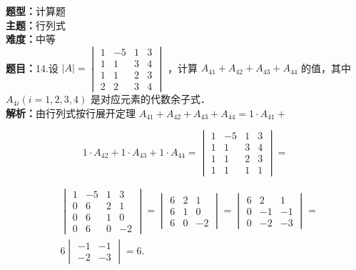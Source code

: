 \documentclass{ctexart}
\newenvironment{question}[5]{%
	\noindent\textbf{题型：}#1\\
	\textbf{主题：}#2\\
	\textbf{难度：}#3\\
	\textbf{题目：}#4\\
	\textbf{解析：}#5\\
	\vspace{1em}
}{}
\begin{document}
	\begin{question}
		{计算题}
		{行列式}
		{中等}
		{14.设 \(|A|=\begin{vmatrix}1 & -5 & 1 & 3 \\ 1 & 1 & 3 & 4 \\ 1 & 1 & 2 & 3 \\ 2 & 2 & 3 & 4\end{vmatrix}\) ，计算 \(A_{41}+A_{42}+A_{43}+A_{44}\) 的值，其中 \(A_{4 i}(i=1,2,3,4)\) 是对应元素的代数余子式．}
		{由行列式按行展开定理 \(A_{41}+A_{42}+A_{43}+A_{44}=1 \cdot A_{41}+\)
			
			\[
			1 \cdot A_{42}+1 \cdot A_{43}+1 \cdot A_{44}=\begin{vmatrix}
				1 & -5 & 1 & 3 \\
				1 & 1 & 3 & 4 \\
				1 & 1 & 2 & 3 \\
				1 & 1 & 1 & 1
			\end{vmatrix}=
			\]
			
			
			\[
			\begin{aligned}
				& \begin{vmatrix}
					1 & -5 & 1 & 3 \\
					0 & 6 & 2 & 1 \\
					0 & 6 & 1 & 0 \\
					0 & 6 & 0 & -2
				\end{vmatrix}=\begin{vmatrix}
					6 & 2 & 1 \\
					6 & 1 & 0 \\
					6 & 0 & -2
				\end{vmatrix}=\begin{vmatrix}
					6 & 2 & 1 \\
					0 & -1 & -1 \\
					0 & -2 & -3
				\end{vmatrix}= \\
				& 6\begin{vmatrix}
					-1 & -1 \\
					-2 & -3
				\end{vmatrix}=6 .
			\end{aligned}
			\]}
	\end{question}
	
\end{document}
